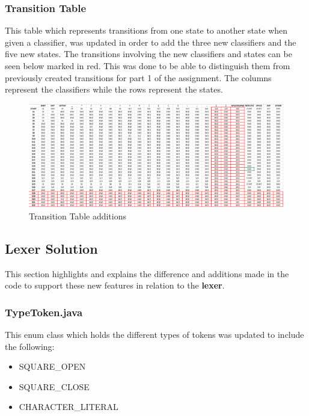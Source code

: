 \documentclass{article}
\begin{document}
				
				\subsubsection{Transition Table}
			
			This table which represents transitions from one state to another state when given a classifier, was updated in order to add the three new classifiers and the five new states. The transitions involving the new classifiers and states can be seen below marked in red. This was done to be able to distinguish them from previously created transitions for part 1 of the assignment. The columns represent the classifiers while the rows represent the states.
			
			 \begin{figure}
			 			\includegraphics[width=\textwidth]{txpart2.png}
			 			\centering
			  			\caption{Transition Table additions}
			  			\label{fig:txtable}
				\end{figure}
			
			\pagebreak
			
			\subsection{Lexer Solution}
			
			This section highlights and explains the difference and additions made in the code to support these new features in relation to the \textbf{lexer}.
			
			\subsubsection{TypeToken.java}
					
					This enum class which holds the different types of tokens was updated to include the following:
					\begin{itemize}
						\item SQUARE\_OPEN
						\item SQUARE\_CLOSE
						\item CHARACTER\_LITERAL
					\end{itemize}
				
\end{document}
